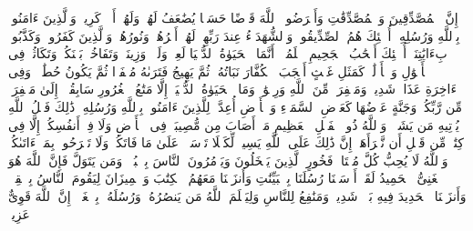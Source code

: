 \stopbuffer
\startbuffer[\q:57:18]
إِنَّ ٱلۡمُصَّدِّقِینَ وَٱلۡمُصَّدِّقَٰتِ وَأَقۡرَضُوا۟ ٱللَّهَ قَرۡضًا حَسَنࣰا یُضَٰعَفُ لَهُمۡ وَلَهُمۡ أَجۡرࣱ كَرِیمࣱ%
\stopbuffer
\startbuffer[\q:57:19]
وَٱلَّذِینَ ءَامَنُوا۟ بِٱللَّهِ وَرُسُلِهِۦۤ أُو۟لَٰۤئِكَ هُمُ ٱلصِّدِّیقُونَۖ وَٱلشُّهَدَاۤءُ عِندَ رَبِّهِمۡ لَهُمۡ أَجۡرُهُمۡ وَنُورُهُمۡۖ وَٱلَّذِینَ كَفَرُوا۟ وَكَذَّبُوا۟ بِءَایَٰتِنَاۤ أُو۟لَٰۤئِكَ أَصۡحَٰبُ ٱلۡجَحِیمِ%
\stopbuffer
\startbuffer[\q:57:20]
ٱعۡلَمُوۤا۟ أَنَّمَا ٱلۡحَیَوٰةُ ٱلدُّنۡیَا لَعِبࣱ وَلَهۡوࣱ وَزِینَةࣱ وَتَفَاخُرُۢ بَیۡنَكُمۡ وَتَكَاثُرࣱ فِی ٱلۡأَمۡوَٰلِ وَٱلۡأَوۡلَٰدِۖ كَمَثَلِ غَیۡثٍ أَعۡجَبَ ٱلۡكُفَّارَ نَبَاتُهُۥ ثُمَّ یَهِیجُ فَتَرَىٰهُ مُصۡفَرࣰّا ثُمَّ یَكُونُ حُطَٰمࣰاۖ وَفِی ٱلۡءَاخِرَةِ عَذَابࣱ شَدِیدࣱ وَمَغۡفِرَةࣱ مِّنَ ٱللَّهِ وَرِضۡوَٰنࣱۚ وَمَا ٱلۡحَیَوٰةُ ٱلدُّنۡیَاۤ إِلَّا مَتَٰعُ ٱلۡغُرُورِ%
\stopbuffer
\startbuffer[\q:57:21]
سَابِقُوۤا۟ إِلَىٰ مَغۡفِرَةࣲ مِّن رَّبِّكُمۡ وَجَنَّةٍ عَرۡضُهَا كَعَرۡضِ ٱلسَّمَاۤءِ وَٱلۡأَرۡضِ أُعِدَّتۡ لِلَّذِینَ ءَامَنُوا۟ بِٱللَّهِ وَرُسُلِهِۦۚ ذَٰلِكَ فَضۡلُ ٱللَّهِ یُؤۡتِیهِ مَن یَشَاۤءُۚ وَٱللَّهُ ذُو ٱلۡفَضۡلِ ٱلۡعَظِیمِ%
\stopbuffer
\startbuffer[\q:57:22]
مَاۤ أَصَابَ مِن مُّصِیبَةࣲ فِی ٱلۡأَرۡضِ وَلَا فِیۤ أَنفُسِكُمۡ إِلَّا فِی كِتَٰبࣲ مِّن قَبۡلِ أَن نَّبۡرَأَهَاۤۚ إِنَّ ذَٰلِكَ عَلَى ٱللَّهِ یَسِیرࣱ%
\stopbuffer
\startbuffer[\q:57:23]
لِّكَیۡلَا تَأۡسَوۡا۟ عَلَىٰ مَا فَاتَكُمۡ وَلَا تَفۡرَحُوا۟ بِمَاۤ ءَاتَىٰكُمۡۗ وَٱللَّهُ لَا یُحِبُّ كُلَّ مُخۡتَالࣲ فَخُورٍ%
\stopbuffer
\startbuffer[\q:57:24]
ٱلَّذِینَ یَبۡخَلُونَ وَیَأۡمُرُونَ ٱلنَّاسَ بِٱلۡبُخۡلِۗ وَمَن یَتَوَلَّ فَإِنَّ ٱللَّهَ هُوَ ٱلۡغَنِیُّ ٱلۡحَمِیدُ%
\stopbuffer
\startbuffer[\q:57:25]
لَقَدۡ أَرۡسَلۡنَا رُسُلَنَا بِٱلۡبَیِّنَٰتِ وَأَنزَلۡنَا مَعَهُمُ ٱلۡكِتَٰبَ وَٱلۡمِیزَانَ لِیَقُومَ ٱلنَّاسُ بِٱلۡقِسۡطِۖ وَأَنزَلۡنَا ٱلۡحَدِیدَ فِیهِ بَأۡسࣱ شَدِیدࣱ وَمَنَٰفِعُ لِلنَّاسِ وَلِیَعۡلَمَ ٱللَّهُ مَن یَنصُرُهُۥ وَرُسُلَهُۥ بِٱلۡغَیۡبِۚ إِنَّ ٱللَّهَ قَوِیٌّ عَزِیزࣱ%
\stopbuffer
